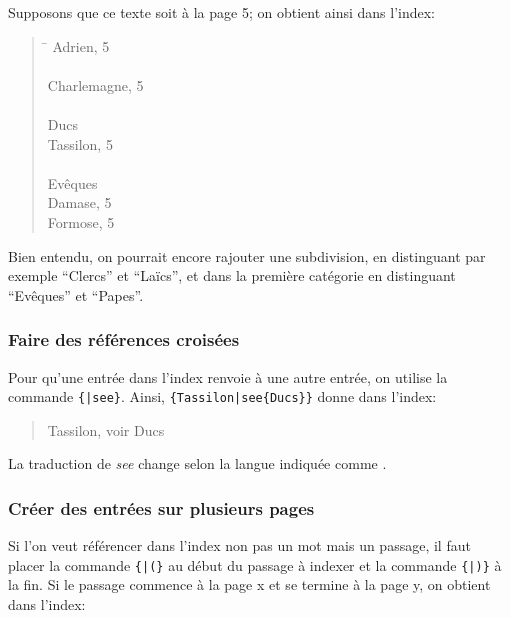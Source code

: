 Supposons que ce texte soit à la page 5; on obtient ainsi dans l'index:
\begin{quotation}
\begin{tabbing}
\hspace{0,5cm}  \= \kill
Adrien, 5 \\
\\
Charlemagne, 5 \\
\\
Ducs \\
\> Tassilon, 5\\
\\
Evêques \\
\> Damase, 5\\
\> Formose, 5\\
\end{tabbing}
\end{quotation}



Bien entendu, on pourrait encore rajouter une subdivision, en distinguant par exemple \enquote{Clercs} et \enquote{Laïcs}, et dans la première catégorie en distinguant \enquote{Evêques} et \enquote{Papes}. 


 
\subsubsection{Faire des références croisées}

Pour qu'une entrée dans l'index renvoie à une autre entrée, on utilise la commande  \verb|{|\verb+|see+\verb|}|. Ainsi,  \verb+{Tassilon|see{Ducs}}+ donne dans l'index:

\begin{quotation}
Tassilon, voir Ducs
\end{quotation}
La traduction de \emph{see} change selon la langue indiquée comme . 



  

\subsubsection{Créer des entrées sur plusieurs pages}

Si l'on veut référencer dans l'index non pas un mot mais un passage, il faut placer la commande \verb|{|\verb+|(}+ au début du passage à indexer et la commande  \verb|{|\verb+|)}+ à la fin. Si le passage commence à la page x et se termine à la page y, on obtient dans l'index: 

